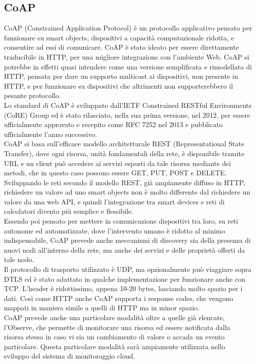 \subsection{CoAP}
CoAP (Constrained Application Protocol) è un protocollo applicativo pensato per funzionare su smart objects, dispositivi a capacità computazionale ridotta, e consentire ad essi di comunicare. CoAP è stato ideato per essere direttamente traducibile in HTTP, per una migliore integrazione con l'ambiente Web. CoAP si potrebbe in effetti quasi intendere come una versione semplificata e rimodellata di HTTP, pensata per dare un supporto multicast ai dispositivi, non presente in HTTP, e per funzionare su dispositivi che altrimenti non supporterebbero il pesante protocollo.
\\Lo standard di CoAP è sviluppato dall'IETF Constrained RESTful Environments (CoRE) Group ed è stato rilasciato, nella sua prima versione, nel 2012, per essere ufficialmente approvato e recepito come RFC 7252 nel 2013 e pubblicato ufficialmente l'anno successivo.
\\CoAP si basa sull'efficace modello architetturale REST (Representational State Transfer), dove ogni risorsa, unità fondamentali della rete, è disponibile tramite URL e un client può accedere ai servizi esposti da tale risorsa mediante dei metodi, che in questo caso possono essere GET, PUT, POST e DELETE. Sviluppando le reti secondo il modello REST, già ampiamente diffuso in HTTP, richiedere un valore ad uno smart objects non è molto differente dal richiedere un valore da una web API, e quindi l'integrazione tra smart devices e reti di calcolatori diventa più semplice e flessibile.
\\Essendo poi pensato per mettere in comunicazione dispositivi tra loro, su reti autonome ed automatizzate, dove l'intervento umano è ridotto al minimo indispensabile, CoAP prevede anche meccanismi di discovery sia della presenza di nuovi nodi all'interno della rete, ma anche dei servizi e delle proprietà offerti da tale nodo.
\\Il protocollo di trasporto utilizzato è UDP, ma opzionalmente può viaggiare sopra DTLS ed è stato adattato in qualche implementazione per funzionare anche con TCP. L'header è ridottissimo, appena 10-20 bytes, lasciando molto spazio per i dati. Così come HTTP anche CoAP supporta i response codes, che vengono mappati in maniera simile a quelli di HTTP ma in minor spazio.
\\CoAP prevede anche una particolare modalità oltre a quelle già elencate, l'Observe, che permette di monitorare una risorsa ed essere notificata dalla risorsa stessa in caso vi sia un cambiamento di valore o accada un evento particolare. Questa particolare modalità sarà ampiamente utilizzata nello sviluppo del sistema di monitoraggio cloud.

